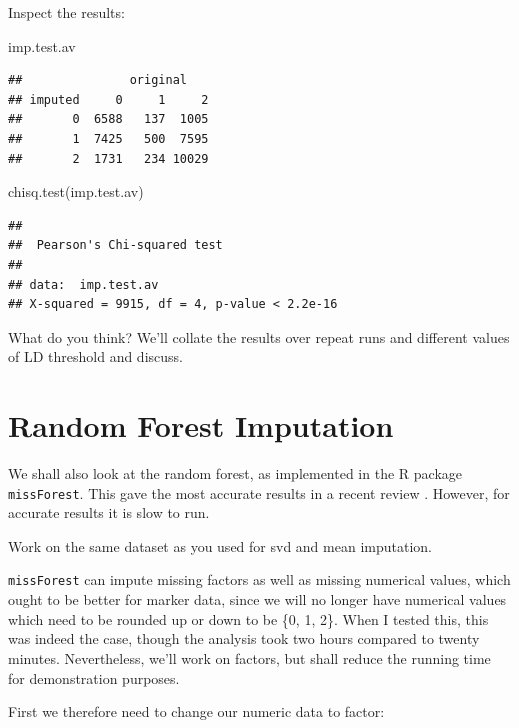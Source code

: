 \documentclass[
]{book}
\newenvironment{Shaded}{\begin{snugshade}}{\end{snugshade}}
\newcommand{\FunctionTok}[1]{\textcolor[rgb]{0.00,0.00,0.00}{#1}}
\newcommand{\NormalTok}[1]{#1}
\begin{document}
Inspect the results:

\begin{Shaded}
\begin{Highlighting}[]
\NormalTok{imp.test.av}
\end{Highlighting}
\end{Shaded}

\begin{verbatim}
##               original
## imputed     0     1     2
##       0  6588   137  1005
##       1  7425   500  7595
##       2  1731   234 10029
\end{verbatim}

\begin{Shaded}
\begin{Highlighting}[]
\FunctionTok{chisq.test}\NormalTok{(imp.test.av)}
\end{Highlighting}
\end{Shaded}

\begin{verbatim}
## 
##  Pearson's Chi-squared test
## 
## data:  imp.test.av
## X-squared = 9915, df = 4, p-value < 2.2e-16
\end{verbatim}

What do you think? We'll collate the results over repeat runs and different values of LD threshold and discuss.

\hypertarget{random-forest-imputation}{%
\section{Random Forest Imputation}\label{random-forest-imputation}}

We shall also look at the random forest, as implemented in the R package \texttt{missForest}. This gave the most accurate results in a recent review \citet{Rutkoski_2013}. However, for accurate results it is slow to run.

Work on the same dataset as you used for svd and mean imputation.

\texttt{missForest} can impute missing factors as well as missing numerical values, which ought to be better for marker data, since we will no longer have numerical values which need to be rounded up or down to be \{0, 1, 2\}. When I tested this, this was indeed the case, though the analysis took two hours compared to twenty minutes. Nevertheless, we'll work on factors, but shall reduce the running time for demonstration purposes.

First we therefore need to change our numeric data to factor:
\end{document}
